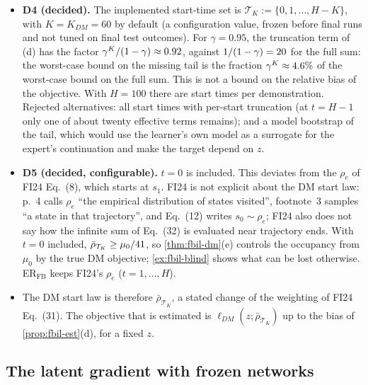 \begin{remark}\label{rem:fbil-u4}
\leavevmode
\begin{itemize}[nosep]
\item \textbf{D4 (decided).} The implemented start-time set is $\mathcal T_K:=\{0,1,\dots,H-K\}$, with $K=K_{DM}=60$ by default (a configuration value, frozen before final runs and not tuned on final test outcomes).
  For $\gamma=0.95$, the truncation term of (d) has the factor $\gamma^K/(1-\gamma)\approx\vn{const.gK_over}{0.92}$, against $1/(1-\gamma)=\vn{const.mass}{20}$ for the full sum: the worst-case bound on the missing tail is the fraction $\gamma^K\approx\vn{const.gK_pct}{4.6}\%$ of the worst-case bound on the full sum. This is not a bound on the relative bias of the objective. With $H=100$ there are  start times per demonstration.
  Rejected alternatives: all start times with per-start truncation (at $t=H-1$ only one of about twenty effective terms remains); and a model bootstrap of the tail, which would use the learner's own model as a surrogate for the expert's continuation and make the target depend on $z$.
\item \textbf{D5 (decided, configurable).} $t=0$ is included. This deviates from the $\rho_e$ of FI24 Eq.~(8), which starts at $s_1$. FI24 is not explicit about the DM start law: p.~4 calls $\rho_e$ ``the empirical distribution of states visited'', footnote~3 samples ``a state in that trajectory'', and Eq.~(12) writes $s_0\sim\rho_e$; FI24 also does not say how the infinite sum of Eq.~(32) is evaluated near trajectory ends.
  With $t=0$ included, $\bar\rho_{\mathcal T_K}\ge\mu_0/\vn{const.n_starts}{41}$, so \cref{thm:fbil-dm}(e) controls the occupancy from $\mu_0$ by the true DM objective; \cref{ex:fbil-blind} shows what can be lost otherwise.
  ER$_{\mathrm{FB}}$ keeps FI24's $\rho_e$ ($t=1,\dots,H$).
\item The DM start law is therefore $\bar\rho_{\mathcal T_K}$, a stated change of the weighting of FI24 Eq.~(31). The objective that is estimated is $\ell_{DM}(z;\bar\rho_{\mathcal T_K})$ up to the bias of \cref{prop:fbil-est}(d), for a fixed $z$.
\end{itemize}
\end{remark}

\subsection{The latent gradient with frozen networks}\label{sec:fbil-grad}

